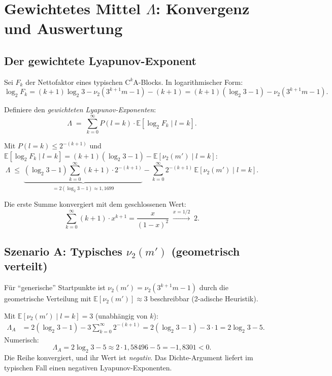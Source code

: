 \documentclass[12pt,a4paper]{article}
\newcommand{\vii}{\nu_2}
\begin{document}
\section{Gewichtetes Mittel $\Lambda$: Konvergenz und Auswertung}
\label{sec:mittel}

\subsection{Der gewichtete Lyapunov-Exponent}

Sei $F_k$ der Nettofaktor eines typischen $\mathrm{C}^k\mathrm{A}$-Blocks.
In logarithmischer Form:
\[
  \log_2 F_k
  = (k+1)\log_2 3 - \vii(3^{k+1}m-1) - (k+1)
  = (k+1)(\log_2 3 - 1) - \vii(3^{k+1}m-1).
\]

Definiere den \emph{gewichteten Lyapunov-Exponenten}:
\[
  \Lambda \;=\; \sum_{k=0}^{\infty} P(l=k) \cdot \mathbb{E}[\log_2 F_k \mid l=k].
\]

Mit $P(l=k) \leq 2^{-(k+1)}$ und
$\mathbb{E}[\log_2 F_k \mid l=k] = (k+1)(\log_2 3 - 1) - \mathbb{E}[\vii(m') \mid l=k]$:
\[
  \Lambda \;\leq\; \underbrace{(\log_2 3 - 1)\sum_{k=0}^{\infty}(k+1)\cdot 2^{-(k+1)}}_{= 2(\log_2 3 - 1) \approx 1{,}1699}
  - \sum_{k=0}^{\infty} 2^{-(k+1)}\,\mathbb{E}[\vii(m')\mid l=k].
\]

Die erste Summe konvergiert mit dem geschlossenen Wert:
\[
  \sum_{k=0}^{\infty}(k+1)\cdot x^{k+1} = \frac{x}{(1-x)^2}
  \;\xrightarrow{x=1/2}\; 2.
\]

\subsection{Szenario A: Typisches $\vii(m')$ (geometrisch verteilt)}

Für ``generische'' Startpunkte ist $\vii(m') = \vii(3^{k+1}m-1)$ durch
die geometrische Verteilung mit $\mathbb{E}[\vii(m')] \approx 3$
beschreibbar (2-adische Heuristik).

\begin{tcolorbox}[ergebnis, title={Szenario A: $\Lambda_A < 0$ (berechnet)}]
Mit $\mathbb{E}[\vii(m') \mid l=k] = 3$ (unabhängig von $k$):
\begin{align*}
  \Lambda_A
  &= 2(\log_2 3 - 1) - 3\sum_{k=0}^{\infty} 2^{-(k+1)}
   = 2(\log_2 3 - 1) - 3\cdot 1
   = 2\log_2 3 - 5.
\end{align*}
Numerisch:
\[
  \boxed{\Lambda_A = 2\log_2 3 - 5 \approx 2\cdot 1{,}58496 - 5 = -1{,}8301 < 0.}
\]
Die Reihe konvergiert, und ihr Wert ist \emph{negativ}. Das Dichte-Argument
liefert im typischen Fall einen negativen Lyapunov-Exponenten.
\end{tcolorbox}
\end{document}
